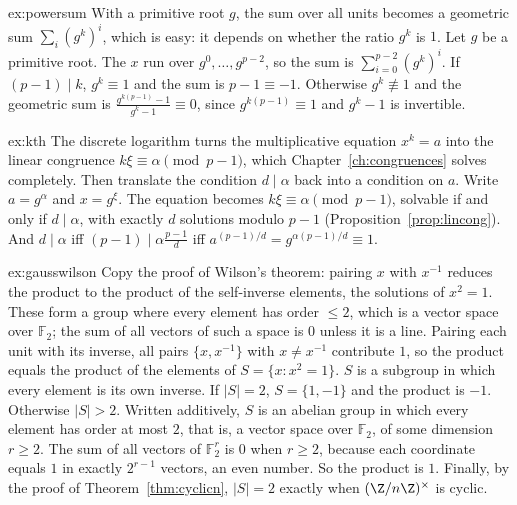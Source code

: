 \begin{solution}{ex:powersum}
\idea With a primitive root $g$, the sum over all units becomes a geometric sum $\sum_i(g^k)^i$, which is easy: it depends on whether the ratio $g^k$ is $1$.
\writeup Let $g$ be a primitive root. The $x$ run over $g^0,\dots,g^{p-2}$, so the sum is $\sum_{i=0}^{p-2}(g^k)^i$. If $(p-1)\mid k$, $g^k\equiv1$ and the sum is $p-1\equiv-1$. Otherwise $g^k\not\equiv1$ and the geometric sum is $\frac{g^{k(p-1)}-1}{g^k-1}\equiv0$, since $g^{k(p-1)}\equiv1$ and $g^k-1$ is invertible.
\end{solution}

\begin{solution}{ex:kth}
\idea The discrete logarithm turns the multiplicative equation $x^k=a$ into the linear congruence $k\xi\equiv\alpha\pmod{p-1}$, which Chapter~\ref{ch:congruences} solves completely. Then translate the condition $d\mid\alpha$ back into a condition on $a$.
\writeup Write $a=g^\alpha$ and $x=g^\xi$. The equation becomes $k\xi\equiv\alpha\pmod{p-1}$, solvable if and only if $d\mid\alpha$, with exactly $d$ solutions modulo $p-1$ (Proposition~\ref{prop:lincong}). And $d\mid\alpha$ iff $(p-1)\mid\alpha\frac{p-1}d$ iff $a^{(p-1)/d}=g^{\alpha(p-1)/d}\equiv1$.
\end{solution}

\begin{solution}{ex:gausswilson}
\idea Copy the proof of Wilson's theorem: pairing $x$ with $x^{-1}$ reduces the product to the product of the self-inverse elements, the solutions of $x^2=1$. These form a group where every element has order $\le2$, which is a vector space over $\mathbb F_2$; the sum of all vectors of such a space is $0$ unless it is a line.
\writeup Pairing each unit with its inverse, all pairs $\{x,x^{-1}\}$ with $x\ne x^{-1}$ contribute $1$, so the product equals the product of the elements of $S=\{x:x^2=1\}$. $S$ is a subgroup in which every element is its own inverse. If $|S|=2$, $S=\{1,-1\}$ and the product is $-1$. Otherwise $|S|>2$. Written additively, $S$ is an abelian group in which every element has order at most $2$, that is, a vector space over $\mathbb F_2$, of some dimension $r\ge2$. The sum of all vectors of $\mathbb F_2^r$ is $0$ when $r\ge2$, because each coordinate equals $1$ in exactly $2^{r-1}$ vectors, an even number. So the product is $1$. Finally, by the proof of Theorem~\ref{thm:cyclicn}, $|S|=2$ exactly when $(\Z/n\Z)^\times$ is cyclic.
\end{solution}

